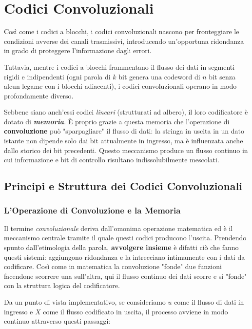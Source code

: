 \chapter{Codici Convoluzionali}
Così come i codici a blocchi, i codici convoluzionali nascono per fronteggiare le condizioni avverse dei canali trasmissivi, introducendo un'opportuna ridondanza in grado di proteggere l'informazione dagli errori.

Tuttavia, mentre i codici a blocchi frammentano il flusso dei dati in segmenti rigidi e indipendenti (ogni parola di $k$ bit genera una codeword di $n$ bit senza alcun legame con i blocchi adiacenti), i codici convoluzionali operano in modo profondamente diverso.

Sebbene siano anch'essi codici \textit{lineari} (strutturati ad albero), il loro codificatore è dotato di \textbf{\textit{memoria}}. È proprio grazie a questa memoria che l'operazione di \textbf{convoluzione} può "sparpagliare" il flusso di dati: la stringa in uscita in un dato istante non dipende solo dai bit attualmente in ingresso, ma è influenzata anche dallo storico dei bit precedenti. Questo meccanismo produce un flusso continuo in cui informazione e bit di controllo risultano indissolubilmente mescolati.
 
\section{Principi e Struttura dei Codici Convoluzionali}


\subsection{L'Operazione di Convoluzione e la Memoria}
Il termine \textit{convoluzionale} deriva dall'omonima operazione matematica ed è il meccanismo centrale tramite il quale questi codici producono l'uscita. Prendendo spunto dall'etimologia della parola, \textbf{avvolgere insieme} è difatti ciò che fanno questi sistemi: aggiungono ridondanza e la intrecciano intimamente con i dati da codificare. Così come in matematica la convoluzione "fonde" due funzioni facendone scorrere una sull'altra, qui il flusso continuo dei dati scorre e si "fonde" con la struttura logica del codificatore.

Da un punto di vista implementativo, se consideriamo $u$ come il flusso di dati in ingresso e $X$ come il flusso codificato in uscita, il processo avviene in modo continuo attraverso questi passaggi:

